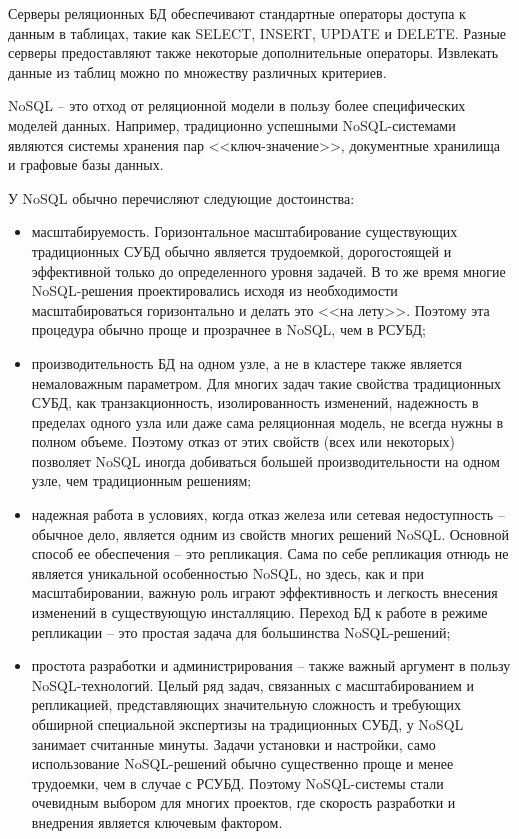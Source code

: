 Серверы реляционных БД обеспечивают стандартные операторы доступа к данным в таблицах, такие как SELECT, INSERT, UPDATE и DELETE. Разные серверы предоставляют также некоторые дополнительные операторы. Извлекать данные из таблиц можно по множеству различных критериев.

NoSQL -- это отход от реляционной модели в пользу более специфических моделей данных. Например, традиционно успешными NoSQL-системами являются системы хранения пар <<ключ-значение>>, документные хранилища и графовые базы данных.

У NoSQL обычно перечисляют следующие достоинства:
\begin{itemize}
  \item масштабируемость. Горизонтальное масштабирование существующих традиционных СУБД обычно является трудоемкой, дорогостоящей и эффективной только до определенного уровня задачей. В то же время многие NoSQL-решения проектировались исходя из необходимости масштабироваться горизонтально и делать это <<на лету>>. Поэтому эта процедура обычно проще и прозрачнее в NoSQL, чем в РСУБД;
  \item производительность БД на одном узле, а не в кластере также является немаловажным параметром. Для многих задач такие свойства традиционных СУБД, как транзакционность, изолированность изменений, надежность в пределах одного узла или даже сама реляционная модель, не всегда нужны в полном объеме. Поэтому отказ от этих свойств (всех или некоторых) позволяет NoSQL иногда добиваться большей производительности на одном узле, чем традиционным решениям;
  \item надежная работа в условиях, когда отказ железа или сетевая недоступность -- обычное дело, является одним из свойств многих решений NoSQL. Основной способ ее обеспечения -- это репликация. Сама по себе репликация отнюдь не является уникальной особенностью NoSQL, но здесь, как и при масштабировании, важную роль играют эффективность и легкость внесения изменений в существующую инсталляцию. Переход БД к работе в режиме репликации -- это простая задача для большинства NoSQL-решений;
  \item простота разработки и администрирования -- также важный аргумент в пользу NoSQL-технологий. Целый ряд задач, связанных с масштабированием и репликацией, представляющих значительную сложность и требующих обширной специальной экспертизы на традиционных СУБД, у NoSQL занимает считанные минуты. Задачи установки и настройки, само использование NoSQL-решений обычно существенно проще и менее трудоемки, чем в случае с РСУБД. Поэтому NoSQL-системы стали очевидным выбором для многих проектов, где скорость разработки и внедрения является ключевым фактором.
\end{itemize}

